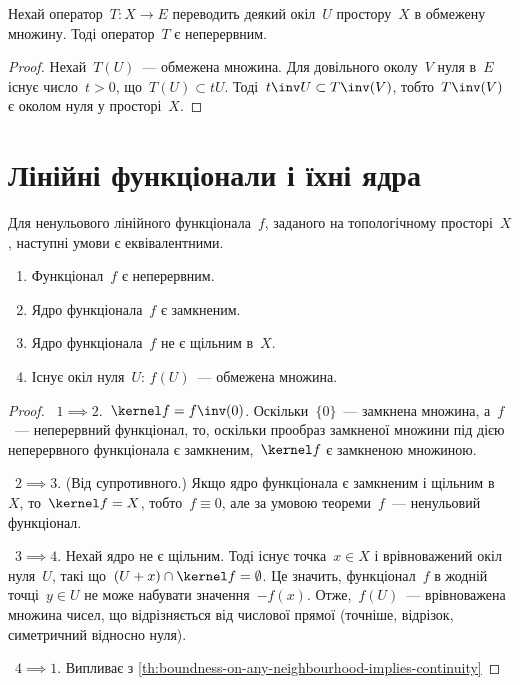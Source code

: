 \begin{theorem}
    \label{th:boundness-on-any-neighbourhood-implies-continuity}
    Нехай оператор~$T: X \to E$ переводить деякий окіл~$U$ простору~$X$ в обмежену множину. Тоді оператор~$T$ є неперервним.
\end{theorem}

\begin{proof}
    Нехай~$T(U)$~--- обмежена множина. Для довільного околу~$V$ нуля в~$E$ існує число~$t > 0$, що~$T(U) \subset t U$. Тоді~$t\inv U \subset T\inv(V)$, тобто~$T\inv(V)$ є околом нуля у просторі~$X$.
\end{proof}

\section{Лінійні функціонали і їхні ядра}

\begin{theorem}
    \label{th:linear-functional-continuity-equivalent-conditions}
    Для ненульового лінійного функціонала~$f$, заданого на топологічному просторі~$X$, наступні умови є еквівалентними.
    \begin{enumerate}
        \item Функціонал~$f$ є неперервним.
        \item Ядро функціонала~$f$ є замкненим.
        \item Ядро функціонала~$f$ не є щільним в~$X$.
        \item Існує окіл нуля~$U$: $f(U)$~--- обмежена множина.
    \end{enumerate}
\end{theorem}

\begin{proof}
   ~$1 \implies 2$.~$\kernel f = f\inv(0)$. Оскільки~$\{0\}$~--- замкнена множина, а~$f$~--- неперервний функціонал, то, оскільки прообраз замкненої множини під дією неперервного функціонала є замкненим,~$\kernel f$ є замкненою множиною.

   ~$2 \implies 3$. (Від супротивного.) Якщо ядро функціонала є замкненим і щільним в~$X$, то~$\kernel f = X$, тобто~$f \equiv 0$, але за умовою теореми~$f$~--- ненульовий функціонал.

   ~$3 \implies 4$. Нехай ядро не є щільним. Тоді існує точка~$x \in X$ і врівноважений окіл нуля~$U$, такі що~$(U + x) \cap \kernel f = \emptyset$. Це значить, функціонал~$f$ в жодній точці~$y \in U$ не може набувати значення~$-f(x)$. Отже,~$f(U)$~--- врівноважена множина чисел, що відрізняється від числової прямої (точніше, відрізок, симетричний відносно нуля).

   ~$4 \implies 1$. Випливає з \cref{th:boundness-on-any-neighbourhood-implies-continuity}
\end{proof}


